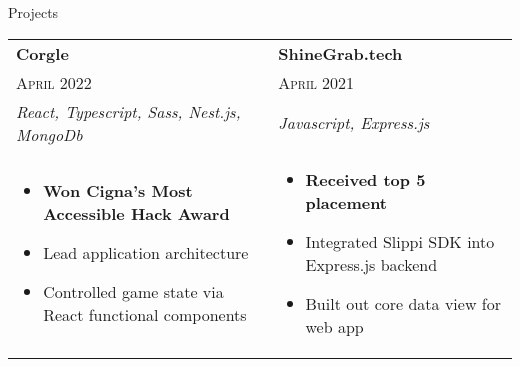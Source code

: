 \documentclass{resume}
\begin{document}
\begin{rSection}{Projects}
    \small
    {
        \begin{tabular}{p{} p{} }%
            \textbf{Corgle}  & \textbf{ShineGrab.tech} \\ \textsc{April 2022} & \textsc{April 2021}\\
            \textit{React, Typescript, Sass, Nest.js, MongoDb} & \textit{Javascript, Express.js}\\
             
            \begin{itemize}
              \item \textbf{Won Cigna's Most Accessible Hack Award}
              \item Lead application architecture  
              \item Controlled game state via React functional components
          \end{itemize} &
            \begin{itemize}
              \item \textbf{Received top 5 placement}
              \item Integrated Slippi SDK into Express.js backend
              \item Built out core data view for web app
            \end{itemize}
        \end{tabular}
    }
\end{rSection}
\end{document}
